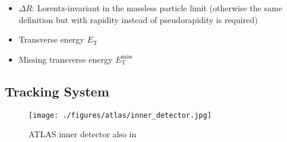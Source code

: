 \begin{itemize}
\item $\Delta R$: Lorentz-invariant in the massless particle limit (otherwise
  the same definition but with rapidity instead of pseudorapidity is required)
\item Transverse energy $E_\text{T}$
\item Missing transverse energy $E_\text{T}^\text{miss}$
\end{itemize}

\subsection{Tracking System}
\label{sec:atlas_tracking}

\begin{figure}[ht]
  \centering
  \texttt{[image: ./figures/atlas/inner\_detector.jpg]}
  \caption{ATLAS inner detector\cite{indet_fig} also in \cite{atlas_detector}}
  \label{fig:atlas_indet}
\end{figure}


